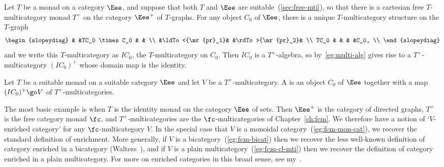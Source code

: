 Let $T$ be a monad on a category $\Eee$, and suppose that both $T$ and
$\Eee$ are suitable~(\ref{sec:free-mti}), so that there is a cartesian free
$T$-multicategory monad $T^+$ on the category $\Eee^+$ of $T$-graphs.  For
any object $C_0$ of $\Eee$, there is a unique $T$-multicategory structure
on the $T$-graph
\[
\begin{slopeydiag}
	&	&TC_0 \times C_0	&		&	\\
	&\ldTo<{\mr{pr}_1}&		&\rdTo>{\mr{pr}_2}&	\\
TC_0	&	&			&		&C_0,	\\
\end{slopeydiag}
\]
and we write this $T$-multicategory as $IC_0$,%
% 
% 
the %
%
%
$T$-multicategory on $C_0$.  Then $IC_0$ is a $T^+$-algebra, so
by~\ref{eg:multi-alg} gives rise to a $T^+$-multicategory $(IC_0)^+$ whose
domain map is the identity.
% 
\begin{defn}%
%
%
%
%
%
Let $T$ be a suitable monad on a suitable category $\Eee$ and let $V$ be a
$T^+$-multicategory.  A  is 
an object $C_0$ of $\Eee$ together with a map $(IC_0)^+ \go V$ of
$T^+$-multicategories. 
\end{defn}

\begin{example}
The most basic example is when $T$ is the identity monad on the category
$\Eee$ of sets.  Then $\Eee^+$ is the category of directed graphs, $T^+$ is
the free category monad $\fc$, and $T^+$-multicategories are the
$\fc$-multicategories of Chapter~\ref{ch:fcm}.  We therefore have a notion
of `$V$-enriched%
%
%
category' for any $\fc$-multicategory%
%
%
$V$.  In the special
case that $V$ is a monoidal category~(\ref{eg:fcm-mon-cat}), we recover the
standard definition of enrichment.  More generally, if $V$ is a
bicategory~(\ref{eg:fcm-bicat}) then we recover the less well-known
definition of category enriched%
%
%
%
%
in a bicategory (Walters~\cite{Wal}),
and if $V$ is a plain multicategory~(\ref{eg:fcm-cl-mti}) then we recover
the definition of category enriched in a plain multicategory.  For more on
enriched categories in this broad sense, see my~\cite{GEC}.
\end{example}

